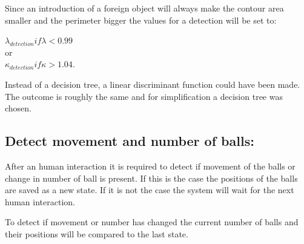Since an introduction of a foreign object will always make the contour area smaller and the perimeter bigger the values for a detection will be set to:

\begin{center}
$\lambda_{detection} if \lambda < 0.99$ \\
or\\
$\kappa_{detection} if \kappa > 1.04$.
\end{center}

Instead of a decision tree, a linear discriminant function could have been made. The outcome is roughly the same and for simplification a decision tree was chosen.

\subsection{Detect movement and number of balls:}
After an human interaction it is required to detect if movement of the balls or change in number of ball is present. If this is the case the positions of the balls are saved as a new state. If it is not the case the system will wait for the next human interaction.

To detect if movement or number has changed the current number of balls and their positions will be compared to the last state.

